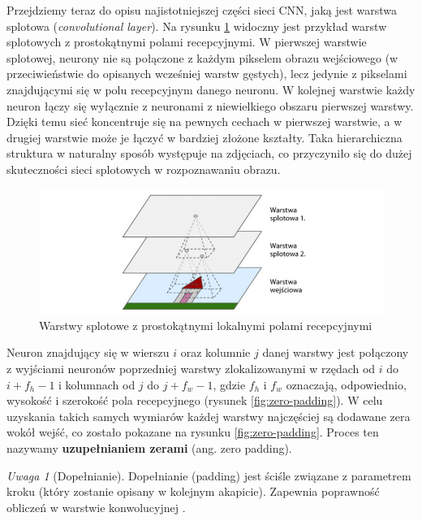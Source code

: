 \documentclass[12pt]{mwbk}
\theoremstyle{plain}
\theoremstyle{definition}
\theoremstyle{remark}
\newtheorem{uwaga}{Uwaga}[chapter]
\newcommand\zrodlo[1]{\par\vspace{-3mm}{\small\textit{Źródło: }#1 }}
\begin{document}
Przejdziemy teraz do opisu najistotniejszej części sieci CNN, jaką jest warstwa splotowa (\emph{convolutional layer}). Na rysunku \ref{fig:warstwy-cnn} widoczny jest przykład warstw splotowych z prostokątnymi polami recepcyjnymi. W pierwszej warstwie splotowej, neurony nie są połączone z każdym pikselem obrazu wejściowego (w przeciwieństwie do opisanych wcześniej warstw gęstych), lecz jedynie z pikselami znajdującymi się w polu recepcyjnym danego neuronu. W kolejnej warstwie każdy neuron łączy się wyłącznie z neuronami z niewielkiego obszaru pierwszej warstwy. Dzięki temu sieć koncentruje się na pewnych cechach w pierwszej warstwie, a w drugiej warstwie może je łączyć w bardziej złożone kształty. Taka hierarchiczna struktura w naturalny sposób występuje na zdjęciach, co przyczyniło się do dużej skuteczności sieci splotowych w rozpoznawaniu obrazu.

\begin{figure}[!h]
	\centering
	\includegraphics[width=\linewidth]{rys/warstwy_cnn.png}
	\caption{Warstwy splotowe z prostokątnymi lokalnymi polami recepcyjnymi}
	\zrodlo{\cite{geron}}
	\label{fig:warstwy-cnn}
\end{figure}

Neuron znajdujący się w wierszu $i$ oraz kolumnie $j$ danej warstwy jest połączony z wyjściami neuronów poprzedniej warstwy zlokalizowanymi w rzędach od $i$ do $i+f_h -1$ i kolumnach od $j$ do $j+f_w -1$,
gdzie $f_h$ i $f_w$ oznaczają, odpowiednio, wysokość i szerokość pola recepcyjnego (rysunek \ref{fig:zero-padding}). W celu
uzyskania takich samych wymiarów każdej warstwy najczęściej są dodawane zera wokół wejść, co zostało pokazane na rysunku \ref{fig:zero-padding}. Proces ten nazywamy \textbf{uzupełnianiem zerami} (ang. zero padding).

\begin{uwaga}[Dopełnianie]
	Dopełnianie (padding) jest ściśle związane z parametrem kroku (który zostanie opisany w kolejnym akapicie). Zapewnia poprawność obliczeń w warstwie konwolucyjnej \cite{illustrated}.
\end{uwaga}
\end{document}
